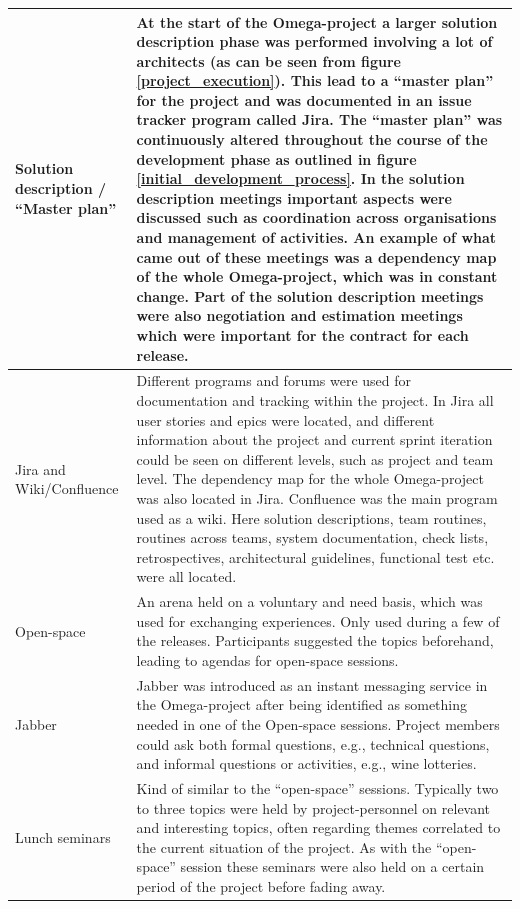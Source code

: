 \begin{center}
\begin{longtable}{| p{6cm} | p{9cm} |}
    Solution description / ``Master plan'' & At the start of the Omega-project a larger solution description phase was performed involving a lot of architects (as can be seen from figure \ref{project_execution}). This lead to a ``master plan'' for the project and was documented in an issue tracker program called Jira. The ``master plan'' was continuously altered throughout the course of the development phase as outlined in figure \ref{initial_development_process}. In the solution description meetings important aspects were discussed such as coordination across organisations and management of activities. An example of what came out of these meetings was a dependency map of the whole Omega-project, which was in constant change. Part of the solution description meetings were also negotiation and estimation meetings which were important for the contract for each release. \\ \hline
    Jira and Wiki/Confluence & Different programs and forums were used for documentation and tracking within the project. In Jira all user stories and epics were located, and different information about the project and current sprint iteration could be seen on different levels, such as project and team level. The dependency map for the whole Omega-project was also located in Jira. Confluence was the main program used as a wiki. Here solution descriptions, team routines, routines across teams, system documentation, check lists, retrospectives, architectural guidelines, functional test etc. were all located. \\ \hline
    Open-space & An arena held on a voluntary and need basis, which was used for exchanging experiences. Only used during a few of the releases. Participants suggested the topics beforehand, leading to agendas for open-space sessions. \\ \hline
    Jabber & Jabber was introduced as an instant messaging service in the Omega-project after being identified as something needed in one of the Open-space sessions. Project members could ask both formal questions, e.g., technical questions, and informal questions or activities, e.g., wine lotteries. \\ \hline
    Lunch seminars & Kind of similar to the ``open-space'' sessions. Typically two to three topics were held by project-personnel on relevant and interesting topics, often regarding themes correlated to the current situation of the project. As with the ``open-space'' session these seminars were also held on a certain period of the project before fading away. \\ \hline

\end{longtable}
\end{center}
